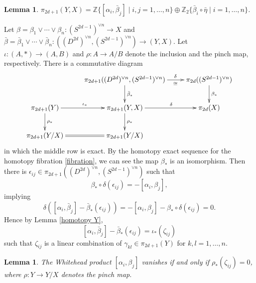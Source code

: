 \documentclass[a4paper]{amsart}
\numberwithin{equation}{section}
\newtheorem{lemma}[theorem]{Lemma}
\theoremstyle{definition}
\theoremstyle{remark}
\numberwithin{equation}{section}
\newcommand{\Z}{\mathbb{Z}}
\begin{document}
\begin{lemma}
  \label{homotopy (Y,X)}
  $\pi_{2d+1}(Y,X)=\Z\{[\alpha_i,\bar{\beta}_j]\mid i,j=1,\ldots,n\}\oplus\Z_2\{\bar{\beta}_i\circ\bar{\eta}\mid i=1,\ldots,n\}$.
\end{lemma}



Let $\beta=\beta_1\vee\cdots\vee\beta_n\colon(S^{2d-1})^{\vee n}\to X$ and $\bar{\beta}=\bar{\beta}_1\vee\cdots\vee\bar{\beta}_n\colon((D^{2d})^{\vee n},(S^{2d-1})^{\vee n})\to(Y,X)$. Let $\iota\colon(A,*)\to(A,B)$ and $\rho\colon A\to A/B$ denote the inclusion and the pinch map, respectively. There is a commutative diagram
\begin{equation}
  \label{pinch}
  \xymatrix{
  &\pi_{2d+1}((D^{2d})^{\vee n},(S^{2d-1})^{\vee n})\ar[r]^(.6)\delta_(.6)\cong\ar[d]^{\bar{\beta}_*}&\pi_{2d}((S^{2d-1})^{\vee n})\ar[d]^{\beta_*}\\
  \pi_{2d+1}(Y)\ar[r]^{\iota_*}\ar[d]^{\rho_*}&\pi_{2d+1}(Y,X)\ar[r]^(.55)\delta\ar[d]^{\rho_*}&\pi_{2d}(X)\\
  \pi_{2d+1}(Y/X)\ar@{=}[r]&\pi_{2d+1}(Y/X)
  }
\end{equation}
in which the middle row is exact. By the homotopy exact sequence for the homotopy fibration \eqref{fibration}, we can see the map $\beta_*$ is an isomorphism. Then there is $\epsilon_{ij}\in\pi_{2d+1}((D^{2d})^{\vee n},(S^{2d-1})^{\vee n})$ such that
\begin{equation}
  \label{epsilon def}
  \beta_*\circ\delta(\epsilon_{ij})=-[\alpha_i,\beta_j],
\end{equation}
implying
\[
  \delta([\alpha_i,\bar{\beta}_j]-\bar{\beta}_*(\epsilon_{ij}))=-[\alpha_i,\beta_j]-\beta_*\circ\delta(\epsilon_{ij})=0.
\]
Hence by Lemma \ref{homotopy Y},
\begin{equation}
  \label{epsilon,zeta}
  [\alpha_i,\bar{\beta}_j]-\bar{\beta}_*(\epsilon_{ij})=\iota_*(\zeta_{ij})
\end{equation}
such that $\zeta_{ij}$ is a linear combination of $\gamma_{kl}\in\pi_{2d+1}(Y)$ for $k,l=1,\ldots,n$.



\begin{lemma}
  \label{epsilon}
  The Whitehead product $[\alpha_i,\beta_j]$ vanishes if and only if $\rho_*(\zeta_{ij})=0$, where $\rho\colon Y\to Y/X$ denotes the pinch map.
\end{lemma}
\end{document}
